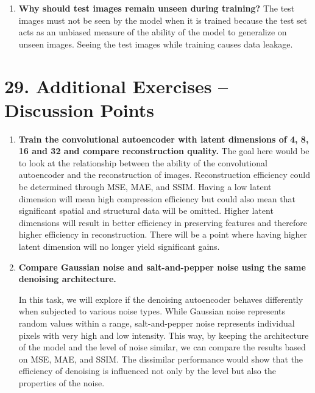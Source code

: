 \documentclass[10pt]{article}
\begin{document}
\begin{enumerate}
\item \textbf{Why should test images remain unseen during training?}
The test images must not be seen by the model when it is trained because the test set acts as an unbiased measure of the ability of the model to generalize on unseen images. Seeing the test images while training causes data leakage.

\end{enumerate}
\section*{29. Additional Exercises -- Discussion Points}

\begin{enumerate}

\item \textbf{Train the convolutional autoencoder with latent dimensions of 4, 8, 16 and 32 and compare reconstruction quality.}
The goal here would be to look at the relationship between the ability of the convolutional autoencoder and the reconstruction of images. Reconstruction efficiency could be determined through MSE, MAE, and SSIM. Having a low latent dimension will mean high compression efficiency but could also mean that significant spatial and structural data will be omitted. Higher latent dimensions will result in better efficiency in preserving features and therefore higher efficiency in reconstruction. There will be a point where having higher latent dimension will no longer yield significant gains.

\item \textbf{Compare Gaussian noise and salt-and-pepper noise using the same denoising architecture.}

In this task, we will explore if the denoising autoencoder behaves differently when subjected to various noise types. While Gaussian noise represents random values within a range, salt-and-pepper noise represents individual pixels with very high and low intensity. This way, by keeping the architecture of the model and the level of noise similar, we can compare the results based on MSE, MAE, and SSIM. The dissimilar performance would show that the efficiency of denoising is influenced not only by the level but also the properties of the noise.


\end{enumerate}
\end{document}
